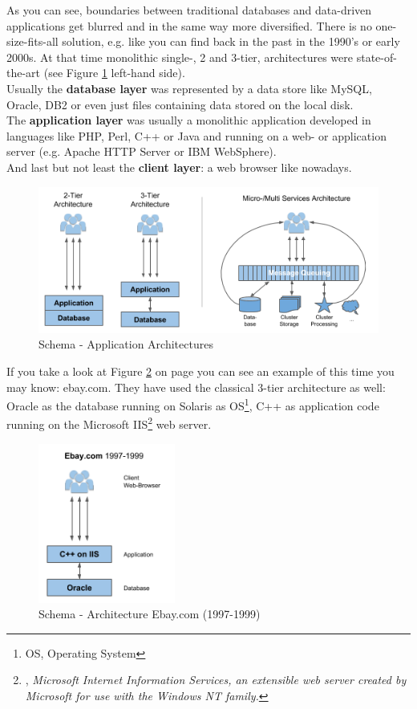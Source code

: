 As you can see, boundaries between traditional databases and data-driven applications get blurred and in the same way more diversified. 
There is no one-size-fits-all solution, e.g. like you can find back in the past in the 1990's or early 2000s. 
At that time monolithic single-, 2 and 3-tier, architectures were state-of-the-art (see Figure \ref{schema_application_architectures} left-hand side). \\
Usually the \textbf{database layer} was represented by a data store like MySQL, Oracle, DB2 or even just files containing data stored on the local disk.\\
The \textbf{application layer} was usually a monolithic application developed in languages like PHP, Perl, C++ or Java and running on a web- or application server (e.g. Apache HTTP Server or IBM WebSphere).\\
And last but not least the \textbf{client layer}: a web browser like nowadays.\\
\begin{figure}[ht]
	\centering
  \includegraphics[width=1\textwidth]{application_architectures.png}
	\caption{Schema - Application Architectures}
	\label{schema_application_architectures}
\end{figure}
If you take a look at Figure \ref{schema_ebay_architecture_1997_1999} on page \pageref{schema_ebay_architecture_1997_1999} you can see an example of this time you may know: ebay.com. They have used the classical 3-tier architecture as well: Oracle as the database running on Solaris as OS\footnote{OS, Operating System}, C++ as application code running on the Microsoft IIS\footnote{\cite{IIS}, \textit{Microsoft Internet Information Services, an extensible web server created by Microsoft for use with the Windows NT family.}} web server.
\begin{figure}[ht]
	\centering
  \includegraphics[width=0.4\textwidth]{ebay_architecture_199799.png}
	\caption{Schema - Architecture Ebay.com (1997-1999)}
	\label{schema_ebay_architecture_1997_1999}
\end{figure}
